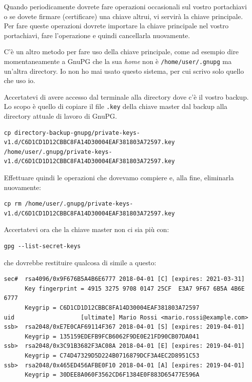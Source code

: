 \documentclass[a4paper,10pt]{article}
\begin{document}
Quando periodicamente dovrete fare operazioni occasionali sul vostro portachiavi o se dovete firmare (certificare) una chiave altrui, vi servirà la chiave principale. Per fare queste operazioni dovrete importare la chiave principale nel vostro portachiavi, fare l'operazione e quindi cancellarla nuovamente.

C'è un altro metodo per fare uso della chiave principale, come ad esempio dire momentaneamente a GnuPG che la sua \textit{home} non è \texttt{/home/user/.gnupg} ma un'altra directory. Io non ho mai usato questo sistema, per cui scrivo solo quello che uso io.

Accertatevi di avere accesso dal terminale alla directory dove c'è il vostro backup. Lo scopo è quello di copiare il file \texttt{.key} della chiave master dal backup alla directory attuale di lavoro di GnuPG.

\begin{lstlisting}
cp directory-backup-gnupg/private-keys-v1.d/C6D1CD1D12CBBC8FA14D30004EAF381803A72597.key /home/user/.gnupg/private-keys-v1.d/C6D1CD1D12CBBC8FA14D30004EAF381803A72597.key
\end{lstlisting}

Effettuare quindi le operazioni che dovevamo compiere e, alla fine, eliminarla nuovamente:

\begin{lstlisting}
cp rm /home/user/.gnupg/private-keys-v1.d/C6D1CD1D12CBBC8FA14D30004EAF381803A72597.key
\end{lstlisting}

Accertatevi ora che la chiave master non ci sia più con:

\begin{lstlisting}
gpg --list-secret-keys
\end{lstlisting}

che dovrebbe restituire qualcosa di simile a questo:

\begin{lstlisting}
sec#  rsa4096/0x9F676B5A4B6E6777 2018-04-01 [C] [expires: 2021-03-31]
      Key fingerprint = 4915 3275 9708 0147 25CF  E3A7 9F67 6B5A 4B6E 6777
      Keygrip = C6D1CD1D12CBBC8FA14D30004EAF381803A72597
uid                   [ultimate] Mario Rossi <mario.rossi@example.com>
ssb>  rsa2048/0xE7E0CAF69114F367 2018-04-01 [S] [expires: 2019-04-01]
      Keygrip = 135159EDEFB9FCB6062F9DE0E21FD90CB07DA041
ssb>  rsa2048/0x3C91B3682F3AC08A 2018-04-01 [E] [expires: 2019-04-01]
      Keygrip = C74D47329D5D224B0716879DCF3A4EC2D8951C53
ssb>  rsa2048/0x465ED456AFBE0F10 2018-04-01 [A] [expires: 2019-04-01]
      Keygrip = 30DEE8A060F3562CD6F1384E0F883D65477E596A
\end{lstlisting}
\end{document}
